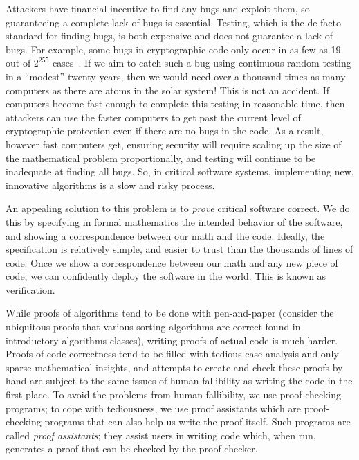Attackers have financial incentive to find any bugs and exploit them, so guaranteeing a complete lack of bugs is essential.
Testing, which is the de facto standard for finding bugs, is both expensive and does not guarantee a lack of bugs.
For example, some bugs in cryptographic code only occur in as few as 19 out of $2^{255}$ cases~\cite{curve25519-donna-commit-correct-bounds}.
If we aim to catch such a bug using continuous random testing in a ``modest'' twenty years, then we would need over a thousand times as many computers as there are atoms in the solar system!
This is not an accident.
If computers become fast enough to complete this testing in reasonable time, then attackers can use the faster computers to get past the current level of cryptographic protection even if there are no bugs in the code. 
As a result, however fast computers get, ensuring security will require scaling up the size of the mathematical problem proportionally, and testing will continue to be inadequate at finding all bugs.
So, in critical software systems, implementing new, innovative algorithms is a slow and risky process.






An appealing solution to this problem is to \emph{prove} critical software correct. 
We do this by specifying in formal mathematics the intended behavior of the software, and showing a correspondence between our math and the code.
Ideally, the specification is relatively simple, and easier to trust than the thousands of lines of code.
Once we show a correspondence between our math and any new piece of code, we can confidently deploy the software in the world. 
This is known as verification. 

While proofs of algorithms tend to be done with pen-and-paper (consider the ubiquitous proofs that various sorting algorithms are correct found in introductory algorithms classes), writing proofs of actual code is much harder.
Proofs of code-correctness tend to be filled with tedious case-analysis and only sparse mathematical insights, and attempts to create and check these proofs by hand are subject to the same issues of human fallibility as writing the code in the first place.
To avoid the problems from human fallibility, we use proof-checking programs; to cope with tediousness, we use proof assistants which are proof-checking programs that can also help us write the proof itself. 
Such programs are called \emph{proof assistants}; they assist users in writing code which, when run, generates a proof that can be checked by the proof-checker.

